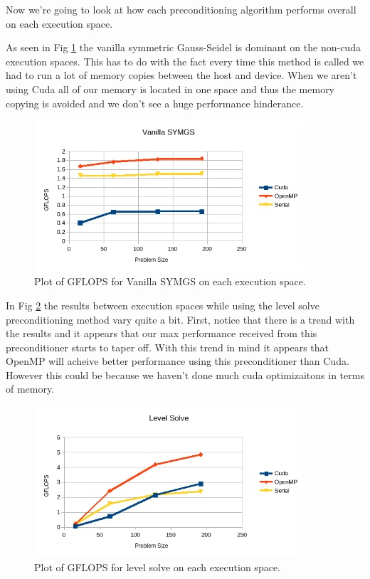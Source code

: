 \documentclass{ccr15}
\begin{document}
Now we're going to look at how each preconditioning algorithm performs overall on each execution
space.

As seen in Fig \ref{Vanilla} the vanilla symmetric Gauss-Seidel is dominant on the non-cuda
execution spaces. This has to do with the fact every time this method is called we had to run
a lot of memory copies between the host and device. When we aren't using Cuda all of our memory
is located in one space and thus the memory copying is avoided and we don't see a huge
performance hinderance.

\begin{figure}[H]
  \centering
  \includegraphics[width=10cm]{plots/ZAB-VanillaSYMGS.png}
  \caption{Plot of GFLOPS for Vanilla SYMGS on each execution space.}
	\label{Vanilla}
\end{figure}

In Fig \ref{Level} the results between execution spaces while using the level solve
preconditioning method vary quite a bit. First, notice that there is a trend with the results and
it appears that our max performance received from this preconditioner starts to taper off. With
this trend in mind it appears that OpenMP will acheive better performance using this
preconditioner than Cuda. However this could be because we haven't done much cuda optimizaitons
in terms of memory.

\begin{figure}[H]
	\centering
	\includegraphics[width=10cm]{plots/ZAB-LevelSolve.png}
	\caption{Plot of GFLOPS for level solve on each execution space.}
	\label{Level}
\end{figure}
\end{document}
